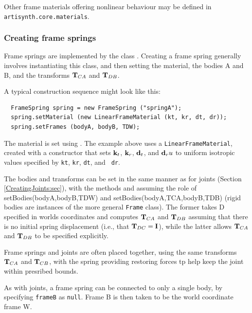 Other frame materials offering nonlinear behaviour may be defined in
{\tt artisynth.core.materials}.

\subsubsection{Creating frame springs}
\label{CreatingFrameSprings:sec}

Frame springs are implemented by the class
.  Creating a frame
spring generally involves instantiating this class, and then setting
the material, the bodies A and B, and the transforms ${\bf T}_{CA}$ and
${\bf T}_{DB}$.

A typical construction sequence might look like this:
%
\begin{lstlisting}
  FrameSpring spring = new FrameSpring ("springA");
  spring.setMaterial (new LinearFrameMaterial (kt, kr, dt, dr));
  spring.setFrames (bodyA, bodyB, TDW);
\end{lstlisting}
%
The material is set using
.
The example above uses a {\tt LinearFrameMaterial}, created with a
constructor that sets ${\bf k}_t$, ${\bf k}_r$, ${\bf d}_t$, and ${\bf d}_ru$ to uniform
isotropic values specified by {\tt kt}, {\tt kr}, {\tt dt}, and {\tt
dr}. 

The bodies and transforms can be set in the same manner as for joints
(Section \ref{CreatingJoints:sec}), with the methods
and
assuming the role of {setBodies(bodyA,bodyB,TDW)} and
{setBodies(bodyA,TCA,bodyB,TDB)} (rigid bodies are instances of the
more general {\tt Frame} class). The former takes D specified in
worlds coordinates and computes ${\bf T}_{CA}$ and ${\bf T}_{DB}$ assuming that
there is no initial spring displacement (i.e., that ${\bf T}_{DC} = {\bf I}$),
while the latter allows ${\bf T}_{CA}$ and ${\bf T}_{DB}$ to be specified
explicitly.

Frame springs and joints are often placed together, using the same
transforms ${\bf T}_{CA}$ and ${\bf T}_{CB}$, with the spring providing
restoring forces tp help keep the joint within presribed bounds.

As with joints, a frame spring can be connected to only a single body,
by specifying {\tt frameB} as {\tt null}. Frame B is then taken to be
the world coordinate frame W.

